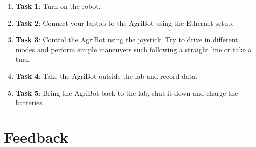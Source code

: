 \documentclass[10pt,a4paper]{article}
\begin{document}
\begin{enumerate}
	\item \textbf{Task 1}: Turn on the robot.

	\item \textbf{Task 2}: Connect your laptop to the AgriBot using the Ethernet setup.

	\item \textbf{Task 3}: Control the AgriBot using the joystick. Try to drive in different modes and perform simple maneuvers such following a straight line or take a turn.
				
	\item \textbf{Task 4}: Take the AgriBot outside the lab and record data.
		
	\item \textbf{Task 5}: Bring the AgriBot back to the lab, shut it down and
		charge the batteries. 
		
\end{enumerate}

\section{Feedback}
\end{document}
